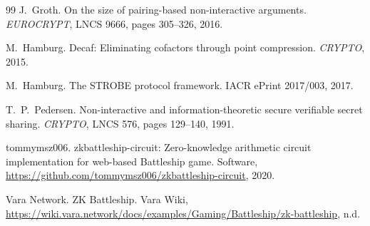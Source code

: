 \documentclass[11pt]{article}
\theoremstyle{definition}
\theoremstyle{remark}
\begin{document}
\begin{thebibliography}{99}
J.~Groth.
\newblock On the size of pairing-based non-interactive arguments.
\newblock \emph{EUROCRYPT}, LNCS 9666, pages 305--326, 2016.

M.~Hamburg.
\newblock Decaf: Eliminating cofactors through point compression.
\newblock \emph{CRYPTO}, 2015.

M.~Hamburg.
\newblock The STROBE protocol framework.
\newblock IACR ePrint 2017/003, 2017.

T.~P.~Pedersen.
\newblock Non-interactive and information-theoretic secure verifiable secret sharing.
\newblock \emph{CRYPTO}, LNCS 576, pages 129--140, 1991.

tommymsz006.
\newblock zkbattleship-circuit: Zero-knowledge arithmetic circuit implementation for web-based Battleship game.
\newblock Software, \url{https://github.com/tommymsz006/zkbattleship-circuit}, 2020.

Vara Network.
\newblock ZK Battleship.
\newblock Vara Wiki, \url{https://wiki.vara.network/docs/examples/Gaming/Battleship/zk-battleship}, n.d.
\end{thebibliography}
\end{document}
